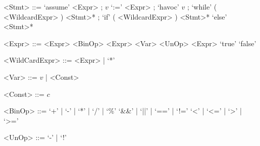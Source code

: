 
\begin{grammar}
	<Stmt> ::= `assume' <Expr> ;
	\alt $v$ `:=' <Expr> ;
	\alt `havoc' $v$ ;
	\alt `while' ( <WildcardExpr> ) <Stmt>* ;
	\alt `if' ( <WildcardExpr> ) <Stmt>* `else' <Stmt>*
	
	<Expr> ::= <Expr> <BinOp> <Expr>
	\alt <Var>
	\alt <UnOp> <Expr>
	\alt `true'
	\alt `false'
	
	<WildCardExpr> ::= <Expr> | `*'
	
	<Var> ::= 	$v$ | <Const>

	<Const> ::= $c$
	
	<BinOp> ::= `+' | `-' | `*' | `/' | `\%'
	\alt `\&\&' | `||' | `==' | `!='
	\alt `<' | `<=' | `>' | `>='
	
	<UnOp> ::= `-' | `!'
\end{grammar}